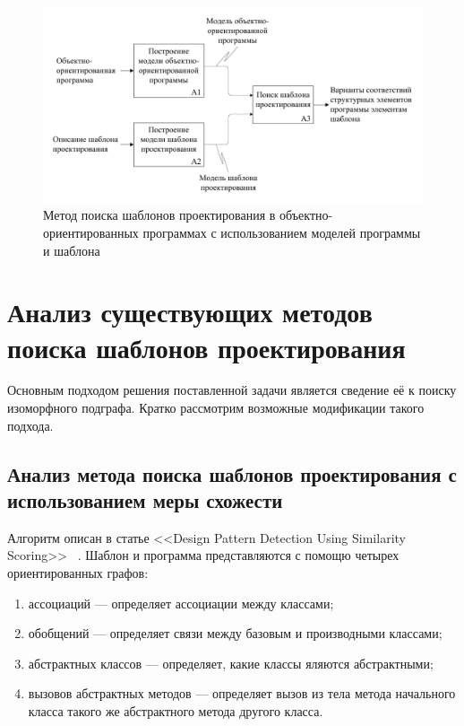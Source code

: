 \begin{figure}
\centering
\includegraphics[width=\textwidth]{inc/idef0-general.pdf}
\caption{Метод поиска шаблонов проектирования в объектно-ориентированных программах с использованием моделей программы и шаблона}
\label{fig:idef0-general}
\end{figure}

\section{Анализ существующих методов поиска шаблонов проектирования}

Основным подходом решения поставленной задачи является сведение её к поиску
изоморфного подграфа.
Кратко рассмотрим возможные модификации такого подхода.

\subsection{Анализ метода поиска шаблонов проектирования с использованием меры схожести}

Алгоритм описан в статье <<Design Pattern Detection Using Similarity Scoring>>
~\cite{DesignPatternSimilarityScoring}.
Шаблон и программа представляются с помощю четырех ориентированных графов:
\begin{enumerate}
\item ассоциаций --- определяет ассоциации между классами;
\item обобщений --- определяет связи между базовым и производными классами;
\item абстрактных классов --- определяет, какие классы яляются абстрактными;
\item вызовов абстрактных методов --- определяет вызов из тела метода начального
класса такого же абстрактного метода другого класса.
\end{enumerate}

